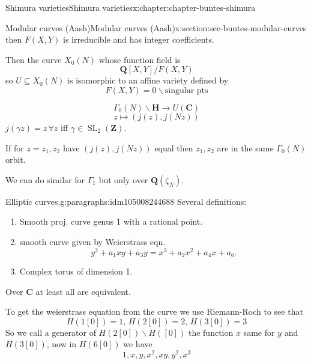 \documentclass[oneside,10pt,]{book}
\numberwithin{equation}{section}
\newcommand{\lb}{[}
\newcommand{\rb}{]}
\newcommand{\ZZ}{\mathbf{Z}}
\newcommand{\QQ}{\mathbf{Q}}
\newcommand{\CC}{\mathbf{C}}
\newcommand{\HH}{\mathbf{H}}
\DeclareMathOperator{\SL}{SL}
\begin{document}
\begin{chapterptx}{Shimura varieties}{}{Shimura varieties}{}{}{x:chapter:chapter-buntes-shimura}
\begin{sectionptx}{Modular curves (Aash)}{}{Modular curves (Aash)}{}{}{x:section:sec-buntes-modular-curves}
\begin{equation*}
\end{equation*}
then \(F(X,Y)\) is irreducible and  has integer coefficients.%
\par
Then the curve \(X_0(N)\) whose function field is%
\begin{equation*}
\QQ \lb X,Y\rb/ F(X,Y)
\end{equation*}
so \(U \subseteq X_0(N)\) is isomorphic to an affine variety defined by%
\begin{equation*}
F(X,Y) = 0 \smallsetminus \text{singular pts}
\end{equation*}
%
\par
%
\begin{equation*}
\Gamma_0(N) \backslash \HH \to U(\CC)
\end{equation*}
%
\begin{equation*}
z \mapsto (j(z), j(Nz))
\end{equation*}
\(j(\gamma z) = z\,\forall z\) iff \(\gamma \in \SL_2(\ZZ)\).%
\par
If for \(z= z_1,z_2\) have \((j(z),j(Nz))\) equal then \(z_1,z_2\) are in the same \(\Gamma_0(N)\) orbit.%
\par
We can do similar for \(\Gamma_1\) but only over \(\QQ(\zeta_N)\).%
\begin{paragraphs}{Elliptic curves.}{g:paragraphs:idm105008244688}%
Several definitions:%
\begin{enumerate}
\item{}Smooth proj. curve genus 1 with a rational point.%
\item{}smooth curve given by Weierstrass eqn.%
\begin{equation*}
y^2 + a_1xy + a_3 y =  x^3 + a_2x^2 + a_4 x + a_6\text{.}
\end{equation*}
%
\item{}Complex torus of  dimension 1.%
\end{enumerate}
%
\par
Over \(\CC\) at least all are equivalent.%
\par
To get the weierstrass equation from the curve we use Riemann-Roch to see that%
\begin{equation*}
H(1[0]) = 1,\, H(2[0]) = 2,\,H(3[0]) =3
\end{equation*}
So we call a generator of \(H(2\lb 0 \rb) \smallsetminus H(\lb 0 \rb)\) the function \(x\) same for \(y\) and \(H(3\lb 0 \rb)\), now in \(H(6 \lb 0 \rb)\) we have%
\begin{equation*}
1,x,y,x^2 ,xy,y^2,x^3
\end{equation*}

\end{paragraphs}
\end{sectionptx}
\end{chapterptx}
\end{document}
